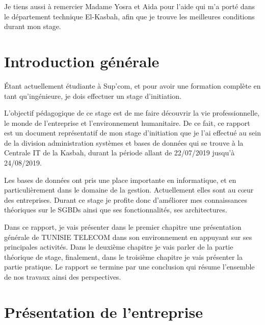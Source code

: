 \documentclass[12pt,a4paper]{report}
\begin{document}
Je tiens aussi à remercier Madame Yosra et Aida pour l'aide qui m'a porté dans le
département technique El-Kasbah, afin que je trouve les meilleures conditions durant
mon stage.

\tableofcontents
\listoffigures


\chapter*{Introduction générale}

Étant actuellement étudiante à Sup'com, et pour avoir une formation complète en tant
qu'ingénieure, je dois effectuer un stage d'initiation.

L'objectif pédagogique de ce stage est de me faire découvrir la vie professionnelle,
le monde de l'entreprise et l'environnement humanitaire. De ce fait, ce rapport est
un document représentatif de mon stage d'initiation que je l'ai effectué au sein de
la division administration systèmes et bases de données qui se trouve à la Centrale
IT de la Kasbah, durant la période allant de 22/07/2019 jusqu'à 24/08/2019.

Les bases de données ont pris une place importante en informatique, et en
particulièrement dans le domaine de la gestion. Actuellement elles sont au c\oe{}ur des
entreprises. Durant ce stage je profite donc d'améliorer mes connaissances théoriques
sur le SGBDs ainsi que ses fonctionnalités, ses architectures.

Dans ce rapport, je vais présenter dans le premier chapitre une présentation générale
de TUNISIE TELECOM dans son environnement en appuyant sur ses principales activités.
Dans le deuxième chapitre je vais parler de la partie théorique de stage, finalement,
dans le troisième chapitre je vais présenter la partie pratique. Le rapport se termine
par une conclusion qui résume l'ensemble de nos travaux ainsi des perspectives.

\chapter{Présentation de l'entreprise}
\end{document}
